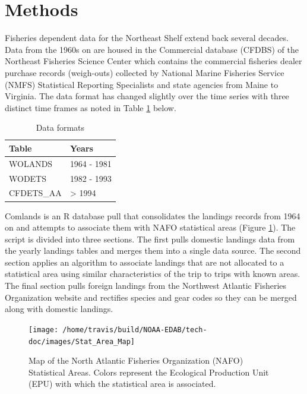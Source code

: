 \documentclass[
]{book}
\begin{document}
\hypertarget{methods-10}{%
\section{Methods}\label{methods-10}}

Fisheries dependent data for the Northeast Shelf extend back several decades. Data from the 1960s on are housed in the Commercial database (CFDBS) of the Northeast Fisheries Science Center which contains the commercial fisheries dealer purchase records (weigh-outs) collected by National Marine Fisheries Service (NMFS) Statistical Reporting Specialists and state agencies from Maine to Virginia. The data format has changed slightly over the time series with three distinct time frames as noted in Table \ref{tab:calibration1} below.

\begin{table}

\caption{\label{tab:calibration1}Data formats}
\centering
\begin{tabular}[t]{ll}
\toprule
Table & Years\\
\midrule
WOLANDS & 1964 - 1981\\
WODETS & 1982 - 1993\\
CFDETS\_AA & > 1994\\
\bottomrule
\end{tabular}
\end{table}

Comlands is an R database pull that consolidates the landings records from 1964 on and attempts to associate them with NAFO statistical areas (Figure \ref{fig:StatAreaMap}). The script is divided into three sections. The first pulls domestic landings data from the yearly landings tables and merges them into a single data source. The second section applies an algorithm to associate landings that are not allocated to a statistical area using similar characteristics of the trip to trips with known areas. The final section pulls foreign landings from the Northwest Atlantic Fisheries Organization website and rectifies species and gear codes so they can be merged along with domestic landings.

\begin{figure}

{\centering \texttt{[image: /home/travis/build/NOAA-EDAB/tech-doc/images/Stat\_Area\_Map]} 

}

\caption{Map of the North Atlantic Fisheries Organization (NAFO) Statistical Areas.  Colors represent the Ecological Production Unit (EPU) with which the statistical area is associated.}\label{fig:StatAreaMap}
\end{figure}
\end{document}
